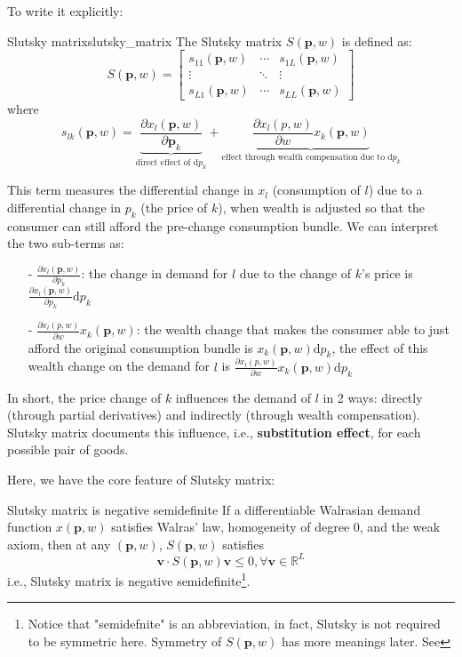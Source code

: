 To write it explicitly:
\begin{definition}{Slutsky matrix}{slutsky_matrix}
    The Slutsky matrix $S(\mathbf{p},w)$ is defined as:
    $$
S(\mathbf{p},w)=
\begin{bmatrix}
    s_{11}(\mathbf{p},w) & \cdots & s_{1L}(\mathbf{p},w)\\
    \vdots & \ddots & \vdots \\
    s_{L1}(\mathbf{p},w) & \cdots & s_{LL}(\mathbf{p},w)
\end{bmatrix}
$$
where $$s_{lk}(\mathbf{p},w)=\underbrace{\frac{\partial x_l(\mathbf{p},w)}{\partial \mathbf{p}_k}}_{\text{direct effect of }\mathrm{d} p_k} +\underbrace{\frac{\partial x_l (p,w)}{\partial w}x_k(\mathbf{p},w)}_{\text{effect through wealth compensation due to }\mathrm{d} p_k}$$
\end{definition}

This term measures the differential change in $x_l$ (consumption of $l$) due to a differential change in $p_k$ (the price of $k$), when wealth is adjusted so that the consumer can still afford the pre-change consumption bundle. We can interpret the two sub-terms as:
\begin{enumerate}
    \item[-] $\frac{\partial x_l(\mathbf{p},w)}{\partial p_k}$: the change in demand for $l$ due to the change of $k$'s price is $\frac{\partial x_l(\mathbf{p},w)}{\partial p_k}\mathrm{d} p_k$
    \item[-] $\frac{\partial x_l (p,w)}{\partial w}x_k(\mathbf{p},w)$: the wealth change that makes the consumer able to just afford the original consumption bundle is $x_k(\mathbf{p},w)\mathrm{d} p_k$, the effect of this wealth change on the demand for $l$ is $\frac{\partial x_l (p,w)}{\partial w}x_k(\mathbf{p},w)\mathrm{d} p_k$
\end{enumerate}
In short, the price change of $k$ influences the demand of $l$ in 2 ways: directly (through partial derivatives) and indirectly (through wealth compensation). Slutsky matrix documents this influence, i.e., \textbf{substitution effect}, for each possible pair of goods. 

Here, we have the core feature of Slutsky matrix: 
\begin{theorem}{Slutsky matrix is negative semidefinite}{}
    If a differentiable Walrasian demand function $ x(\mathbf{p},w)$ satisfies Walras' law, homogeneity of degree 0, and the weak axiom, then at any $(\mathbf{p},w)$, $S(\mathbf{p},w)$ satisfies
    $$\mathbf{v}\cdot S(\mathbf{p},w)\mathbf{v}\leq 0, \forall \mathbf{v}\in\mathbb{R}^L$$
    i.e., Slutsky matrix is negative semidefinite\footnote{Notice that "semidefnite" is an abbreviation, in fact, Slutsky is not required to be symmetric here. Symmetry of $S(\mathbf{p},w)$ has more meanings later. See }.
\end{theorem}

